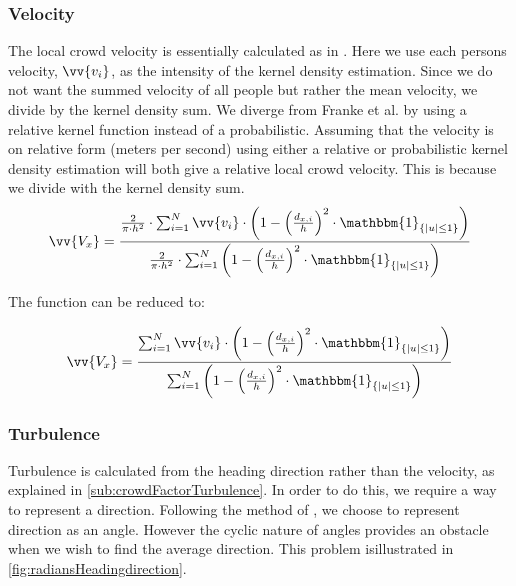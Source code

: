\subsubsection{Velocity}
The local crowd velocity is essentially calculated as in \citet{wirz2012inferring}. Here we use each persons velocity, $\vv{v_i}$, as the intensity of the kernel density estimation. Since we do not want the summed velocity of all people but rather the mean velocity, we divide by the kernel density sum. We diverge from Franke et al. by using a relative kernel function instead of a probabilistic. Assuming that the velocity is on relative form (meters per second) using either a relative or probabilistic kernel density estimation will both give a relative local crowd velocity. This is because we divide with the kernel density sum.
\begin{equation}
\label{eq:}
\vv{V_x} = \frac{\frac{2}{\pi \cdot h^2} \cdot \sum_{i=1}^N \vv{v_i} \cdot \left(1-\left(\frac{d_{x,i}}{h}\right)^2 \cdot \mathbbm{1}_{\{|u| \leq 1\} }\right)}{\frac{2}{\pi \cdot h^2} \cdot \sum_{i=1}^N \left(1-\left(\frac{d_{x,i}}{h}\right)^2 \cdot \mathbbm{1}_{\{|u| \leq 1\} }\right)}
\end{equation}

The function can be reduced to:

\begin{equation}
\label{eq:}
\vv{V_x} = \frac{\sum_{i=1}^N \vv{v_i} \cdot \left(1-\left(\frac{d_{x,i}}{h}\right)^2 \cdot \mathbbm{1}_{\{|u| \leq 1\} }\right)}{\sum_{i=1}^N \left(1-\left(\frac{d_{x,i}}{h}\right)^2 \cdot \mathbbm{1}_{\{|u| \leq 1\} }\right)}
\end{equation}

\subsubsection{Turbulence}\label{subsub:turbu}
Turbulence is calculated from the heading direction rather than the velocity, as explained in \cref{sub:crowdFactorTurbulence}. In order to do this, we require a way to represent a direction. Following the method of \citet{localTrendStatistics}, we choose to represent direction as an angle. However the cyclic nature of angles provides an obstacle when we wish to find the average direction. This problem isillustrated in \cref{fig:radiansHeadingdirection}.


